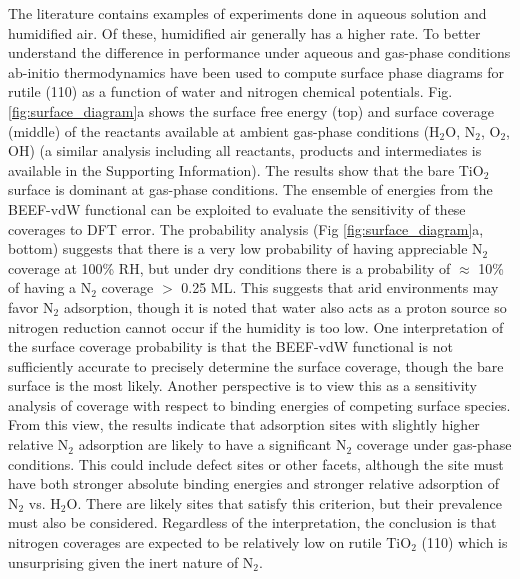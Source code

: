 \documentclass[journal=ascecg,manuscript=article,articletitle=true]{achemso}
\begin{document}
The literature contains examples of experiments done in aqueous solution\cite{Augugliaro_1982,Hirakawa_2017} and humidified air\cite{Schrauzer_1977,Schrauzer_1983}. Of these, humidified air generally has a higher rate.\cite{Schrauzer_2011} To better understand the difference in performance under aqueous and gas-phase conditions ab-initio thermodynamics \cite{Reuter_2001} have been used to compute surface phase diagrams for rutile (110) as a function of water and nitrogen chemical potentials. Fig. \ref{fig:surface_diagram}a shows the surface free energy (top) and surface coverage (middle) of the reactants available at ambient gas-phase conditions (H$_2$O, N$_2$, O$_2$, OH) (a similar analysis including all reactants, products and intermediates is available in the Supporting Information). The results show that the bare TiO$_2$ surface is dominant at gas-phase conditions. The ensemble of energies from the BEEF-vdW functional can be exploited to evaluate the sensitivity of these coverages to DFT error. The probability analysis (Fig \ref{fig:surface_diagram}a, bottom) suggests that there is a very low probability of having appreciable N$_2$ coverage at 100\% RH, but under dry conditions there is a probability of $\approx$ 10\% of having a N$_2$ coverage $>$ 0.25 ML. This suggests that arid environments may favor N$_2$ adsorption, though it is noted that water also acts as a proton source so nitrogen reduction cannot occur if the humidity is too low. One interpretation of the surface coverage probability is that the BEEF-vdW functional is not sufficiently accurate to precisely determine the surface coverage, though the bare surface is the most likely. Another perspective is to view this as a sensitivity analysis of coverage with respect to binding energies of competing surface species. From this view, the results indicate that adsorption sites with slightly higher relative N$_2$ adsorption are likely to have a significant N$_2$ coverage under gas-phase conditions. This could include defect sites or other facets,  although the site must have both stronger absolute binding energies and stronger relative adsorption of N$_2$ vs. H$_2$O. There are likely sites that satisfy this criterion, but their prevalence must also be considered. Regardless of the interpretation, the conclusion is that nitrogen coverages are expected to be relatively low on rutile TiO$_2$ (110) which is unsurprising given the inert nature of N$_2$.
\end{document}
